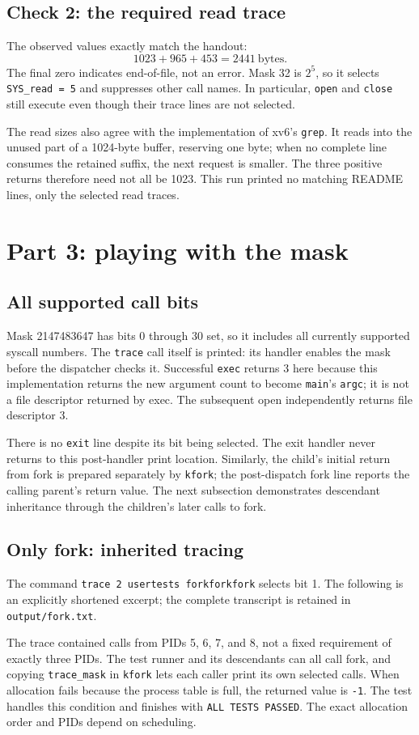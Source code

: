 \documentclass[12pt]{article}
\begin{document}
\clearpage
\subsection{Check 2: the required read trace}

The observed values exactly match the handout:
\[
1023 + 965 + 453 = 2441\ \text{bytes}.
\]
The final zero indicates end-of-file, not an error. Mask 32 is
\(2^5\), so it selects \texttt{SYS\_read = 5} and suppresses other call
names. In particular, \texttt{open} and \texttt{close} still execute even
though their trace lines are not selected.

The read sizes also agree with the implementation of xv6's \texttt{grep}.
It reads into the unused part of a 1024-byte buffer, reserving one byte;
when no complete line consumes the retained suffix, the next request is
smaller. The three positive returns therefore need not all be 1023.
This run printed no matching README lines, only the selected read traces.

\section{Part 3: playing with the mask}
\subsection{All supported call bits}

Mask 2147483647 has bits 0 through 30 set, so it includes all currently
supported syscall numbers. The \texttt{trace} call itself is printed:
its handler enables the mask before the dispatcher checks it. Successful
\texttt{exec} returns 3 here because this implementation returns the new
argument count to become \texttt{main}'s \texttt{argc}; it is not a file
descriptor returned by exec. The subsequent open independently returns
file descriptor 3.

There is no \texttt{exit} line despite its bit being selected. The exit
handler never returns to this post-handler print location. Similarly, the
child's initial return from fork is prepared separately by \texttt{kfork};
the post-dispatch fork line reports the calling parent's return value.
The next subsection demonstrates descendant inheritance through the
children's later calls to fork.

\clearpage
\subsection{Only fork: inherited tracing}
The command \texttt{trace 2 usertests forkforkfork} selects bit 1. The
following is an explicitly shortened excerpt; the complete transcript is
retained in \texttt{output/fork.txt}.

The trace contained calls from PIDs 5, 6, 7, and 8, not a fixed requirement
of exactly three PIDs. The test runner and its descendants can all call
fork, and copying \texttt{trace\_mask} in \texttt{kfork} lets each caller
print its own selected calls. When allocation fails because the process
table is full, the returned value is \texttt{-1}. The test handles this
condition and finishes with \texttt{ALL TESTS PASSED}. The exact allocation
order and PIDs depend on scheduling.
\end{document}
